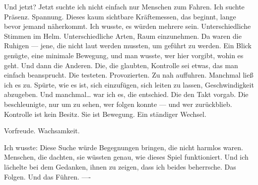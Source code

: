 Und jetzt?
Jetzt suchte ich nicht einfach nur Menschen zum Fahren.
Ich suchte Präsenz. Spannung. Dieses kaum sichtbare Kräftemessen, das beginnt, lange bevor jemand näherkommt.
Ich wusste, es würden mehrere sein. Unterschiedliche Stimmen im Helm. Unterschiedliche Arten, Raum einzunehmen.
Da waren die Ruhigen — jene, die nicht laut werden mussten, um geführt zu werden. Ein Blick genügte, eine minimale Bewegung, und man wusste, wer hier vorgibt, wohin es geht.
Und dann die Anderen. Die, die glaubten, Kontrolle sei etwas, das man einfach beansprucht. Die testeten. Provozierten. Zu nah auffuhren.
Manchmal ließ ich es zu.
Spürte, wie es ist, sich einzufügen, sich leiten zu lassen, Geschwindigkeit abzugeben.
Und manchmal…
war ich es, die entschied.
Die den Takt vorgab. Die beschleunigte, nur um zu sehen, wer folgen konnte — und wer zurückblieb.
Kontrolle ist kein Besitz.
Sie ist Bewegung. Ein ständiger Wechsel.

Vorfreude. Wachsamkeit.

Ich wusste:
Diese Suche würde Begegnungen bringen, die nicht harmlos waren.
Menschen, die dachten, sie wüssten genau, wie dieses Spiel funktioniert.
Und ich lächelte bei dem Gedanken, ihnen zu zeigen,
dass ich beides beherrsche.
Das Folgen.
Und das Führen.
----

